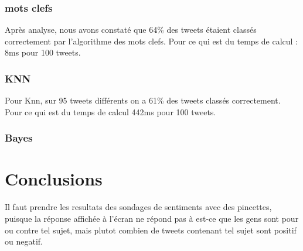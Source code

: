\documentclass[a4paper,10pt]{report}
\begin{document}
    \subsection{mots clefs}
      Après analyse, nous avons constaté que 64\% des tweets étaient classés correctement par l'algorithme des mots clefs.
      Pour ce qui est du temps de calcul : 8ms pour 100 tweets. 
    \subsection{KNN}
      Pour Knn, sur 95 tweets différents on a 61\% des tweets classés correctement.
      Pour ce qui est du temps de calcul 442ms pour 100 tweets.
    \subsection{Bayes}

    
    
\chapter{Conclusions}
Il faut prendre les resultats des sondages de sentiments avec des pincettes, puisque la réponse affichée à l'écran ne répond pas à 
est-ce que les gens sont pour ou contre tel sujet, mais plutot combien de tweets contenant tel sujet sont positif ou negatif. 
\end{document}
